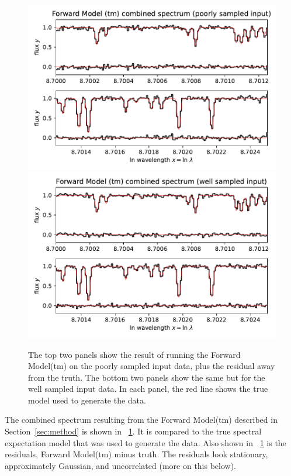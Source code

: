 \documentclass[modern]{aastex631}
\newlength{\figurewidth}
\newcommand{\sectionname}{Section}
\begin{document}
\begin{figure}[t!]
    \begin{mdframed}\begin{center}
    \includegraphics[width=\figurewidth]{notebooks/forward1.pdf}\\
    \includegraphics[width=\figurewidth]{notebooks/forward2.pdf}
    \end{center}
    \caption{The top two panels show the result of running the Forward Model(tm) on the poorly sampled input data, plus the residual away from the truth. The bottom two panels show the same but for the well sampled input data. In each panel, the red line shows the true model used to generate the data.\label{fig:forward}}
    \end{mdframed}
\end{figure}
The combined spectrum resulting from the Forward Model(tm) described in \sectionname~\ref{sec:method} is shown in \figurename~\ref{fig:forward}.
It is compared to the true spectral expectation model that was used to generate the data.
Also shown in \figurename~\ref{fig:forward} is the residuals, Forward Model(tm) minus truth.
The residuals look stationary, approximately Gaussian, and uncorrelated (more on this below).
\end{document}
